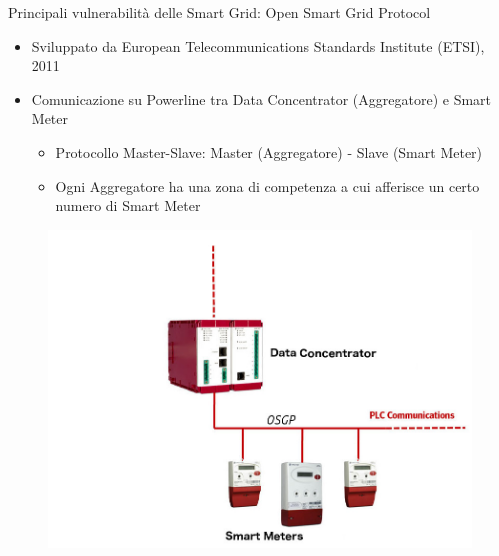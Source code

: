 \begin{frame}{Principali vulnerabilità delle Smart Grid: Open Smart Grid Protocol}
	\begin{itemize}[<+- | alert@+>]
		\item Sviluppato da European Telecommunications Standards Institute (ETSI), 2011
		\item Comunicazione su Powerline tra Data Concentrator (Aggregatore) e Smart Meter
		\begin{itemize} 
			\item Protocollo Master-Slave: Master (Aggregatore) - Slave (Smart Meter)
			\item Ogni Aggregatore ha una zona di competenza a cui afferisce un certo numero di Smart Meter
		\end{itemize}
	\end{itemize}
	\begin{figure}[h] 
		\includegraphics[scale=0.15,cfbox=blue_slides 1pt 0pt]{imgs/aggregator.jpg}
	\end{figure}
\end{frame}

